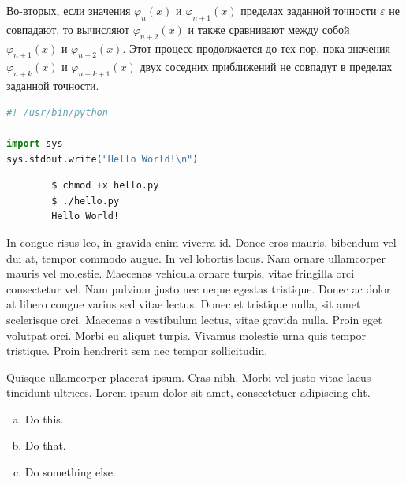 \documentclass{article}
\begin{document}
Во-вторых, если значения $\varphi_{n}(x)$ и $\varphi_{n+1}(x)$ пределах заданной точности $\varepsilon$ не совпадают, то вычисляют $\varphi_{n+2}(x)$ и также сравнивают между собой $\varphi_{n+1}(x)$ и $\varphi_{n+2}(x)$. Этот процесс продолжается до тех пор, пока значения $\varphi_{n+k}(x)$ и $\varphi_{n+k+1}(x)$ двух соседних приближений не совпадут в пределах заданной точности.



\newpage

\begin{file}[hello.py]
\begin{lstlisting}[language=Python]
#! /usr/bin/python

import sys
sys.stdout.write("Hello World!\n")
\end{lstlisting}
\end{file}

\begin{commandline}
	\begin{verbatim}
		$ chmod +x hello.py
		$ ./hello.py
		Hello World!
	\end{verbatim}
\end{commandline}

\begin{warn}[Notice:]
  In congue risus leo, in gravida enim viverra id. Donec eros mauris, bibendum vel dui at, tempor commodo augue. In vel lobortis lacus. Nam ornare ullamcorper mauris vel molestie. Maecenas vehicula ornare turpis, vitae fringilla orci consectetur vel. Nam pulvinar justo nec neque egestas tristique. Donec ac dolor at libero congue varius sed vitae lectus. Donec et tristique nulla, sit amet scelerisque orci. Maecenas a vestibulum lectus, vitae gravida nulla. Proin eget volutpat orci. Morbi eu aliquet turpis. Vivamus molestie urna quis tempor tristique. Proin hendrerit sem nec tempor sollicitudin.
\end{warn}

\begin{question}
	Quisque ullamcorper placerat ipsum. Cras nibh. Morbi vel justo vitae lacus tincidunt ultrices. Lorem ipsum dolor sit amet, consectetuer adipiscing elit.

	\begin{enumerate}[(a)]
		\item Do this.
		\item Do that.
		\item Do something else.
	\end{enumerate}
\end{question}
\end{document}
